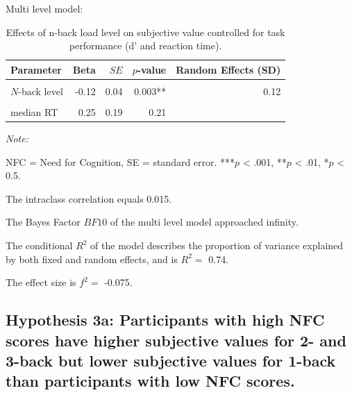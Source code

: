 \documentclass[
  man,floatsintext]{apa6}
\begin{document}
Multi level model:

\begin{table}

\caption{\label{tab:unnamed-chunk-9}Effects of n-back load level on subjective value controlled 
    for task performance (d' and reaction time).}
\centering
\begin{threeparttable}
\begin{tabular}[t]{lrrrr}
\toprule
Parameter & Beta & $SE$ & $p$-value & Random Effects (SD)\\
\midrule
\cellcolor{gray!6}{Intercept} & \cellcolor{gray!6}{0.81} & \cellcolor{gray!6}{0.03} & \cellcolor{gray!6}{<.001***} & \cellcolor{gray!6}{0.09}\\
$N$-back level & -0.12 & 0.04 & 0.003** & 0.12\\
\cellcolor{gray!6}{d'} & \cellcolor{gray!6}{0.02} & \cellcolor{gray!6}{0.02} & \cellcolor{gray!6}{0.238} & \cellcolor{gray!6}{}\\
median RT & 0.25 & 0.19 & 0.21 & \\
\bottomrule
\end{tabular}
\begin{tablenotes}
\item \textit{Note: } 
\item NFC = Need for Cognition, SE = standard error. ***$p$ < .001, **$p$ < .01, *$p$ < 0.5.
\end{tablenotes}
\end{threeparttable}
\end{table}

The intraclass correlation equals 0.015.

The Bayes Factor \(BF10\) of the multi level model approached infinity.

The conditional \(R^2\) of the model describes the proportion of variance explained by both fixed and random effects, and is \(R^2=\) 0.74.

The effect size is \(f^2=\) -0.075.

\newpage

\hypertarget{hypothesis-3a-participants-with-high-nfc-scores-have-higher-subjective-values-for-2--and-3-back-but-lower-subjective-values-for-1-back-than-participants-with-low-nfc-scores.}{%
\subsection{Hypothesis 3a: Participants with high NFC scores have higher subjective values for 2- and 3-back but lower subjective values for 1-back than participants with low NFC scores.}\label{hypothesis-3a-participants-with-high-nfc-scores-have-higher-subjective-values-for-2--and-3-back-but-lower-subjective-values-for-1-back-than-participants-with-low-nfc-scores.}}
\end{document}
